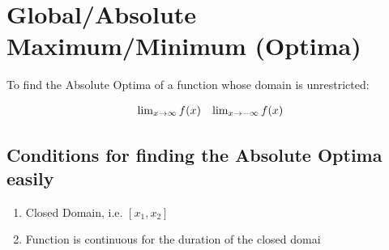 \documentclass[12pt letter]{report}
\begin{document}
\section{Global/Absolute Maximum/Minimum (Optima)}
To find the Absolute Optima of a function whose domain is unrestricted:

\begin{align*}
	\begin{array}{c c}
		\lim_{x \to \infty} f(x) & \lim_{x \to -\infty} f(x)
	\end{array}
\end{align*}

\subsection{Conditions for finding the Absolute Optima easily}

\begin{enumerate}
	\item Closed Domain, i.e. $[x_1,x_2]$
	\item Function is continuous for the duration of the closed domai
\end{enumerate}

\label{thm:evt}
\end{document}
